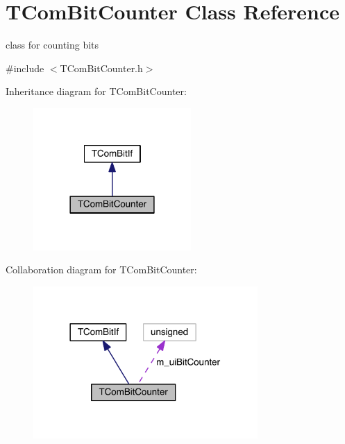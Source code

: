 \hypertarget{class_t_com_bit_counter}{}\section{T\+Com\+Bit\+Counter Class Reference}
\label{class_t_com_bit_counter}


class for counting bits  




{\ttfamily \#include $<$T\+Com\+Bit\+Counter.\+h$>$}



Inheritance diagram for T\+Com\+Bit\+Counter\+:
\nopagebreak
\begin{figure}[H]
\begin{center}
\leavevmode
\includegraphics[width=170pt]{d5/d74/class_t_com_bit_counter__inherit__graph}
\end{center}
\end{figure}


Collaboration diagram for T\+Com\+Bit\+Counter\+:
\nopagebreak
\begin{figure}[H]
\begin{center}
\leavevmode
\includegraphics[width=242pt]{de/d04/class_t_com_bit_counter__coll__graph}
\end{center}
\end{figure}
